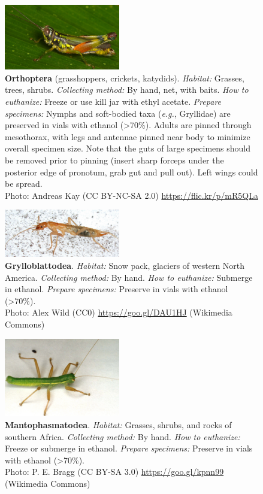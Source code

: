 \documentclass[letterpaper, 11pt]{article}
\begin{document}
\begin{figure}
  \caption{\textbf{Orthoptera} (grasshoppers, crickets, katydids). \textit{Habitat:} Grasses, trees, shrubs. \textit{Collecting method:} By hand, net, with baits. \textit{How to euthanize:} Freeze or use kill jar with ethyl acetate. \textit{Prepare specimens:} Nymphs and soft-bodied taxa (\textit{e.g.}, Gryllidae) are preserved in vials with ethanol (\textgreater70\%). Adults are pinned through mesothorax, with legs and antennae pinned near body to minimize overall specimen size. Note that the guts of large specimens should be removed prior to pinning (insert sharp forceps under the posterior edge of pronotum, grab gut and pull out). Left wings could be spread. \\ Photo: Andreas Kay (CC BY-NC-SA 2.0) \url{https://flic.kr/p/mR5QLa}}
  \includegraphics[width=0.45\textwidth]{Orthoptera}
\end{figure}

\clearpage

\begin{figure}
  \caption{\textbf{Grylloblattodea}. \textit{Habitat:} Snow pack, glaciers of western North America. \textit{Collecting method:} By hand. \textit{How to euthanize:} Submerge in ethanol. \textit{Prepare specimens:} Preserve in vials with ethanol (\textgreater70\%).\\ Photo: Alex Wild (CC0) \url{https://goo.gl/DAU1HJ} (Wikimedia Commons)}
  \includegraphics[width=0.45\textwidth]{Grylloblattodea}
\end{figure}

\begin{figure}
  \caption{\textbf{Mantophasmatodea}. \textit{Habitat:} Grasses, shrubs, and rocks of southern Africa. \textit{Collecting method:} By hand. \textit{How to euthanize:} Freeze or submerge in ethanol. \textit{Prepare specimens:} Preserve in vials with ethanol (\textgreater70\%).\\ Photo: P. E. Bragg (CC BY-SA 3.0) \url{https://goo.gl/kpnn99} (Wikimedia Commons)}
  \includegraphics[width=0.45\textwidth]{Mantophasmatodea}
\end{figure}
\end{document}
